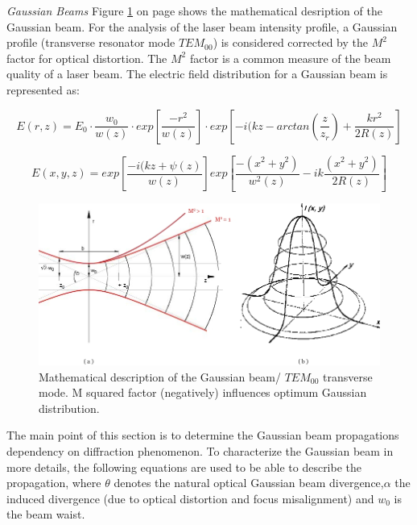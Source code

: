 \textit{Gaussian Beams}
Figure \ref{gaussian_beam} on page \pageref{gaussian_beam} shows the mathematical desription of the Gaussian beam. For the analysis of the \acs{laser} beam intensity profile, a Gaussian profile (transverse resonator mode $TEM_{00}$) is considered corrected by the $M^{2}$ factor for optical distortion. The $M^{2}$ factor is a common measure of the beam quality of a laser beam.  The electric field distribution for a Gaussian beam is represented as:

\begin{equation}
	E(r,z) = E_{0}\cdot \frac{w_{0}}{w(z)} \cdot exp\left[\frac{-r^{2}}{w(z)}\right]\cdot exp\left[-i(kz-arctan\left(\frac{z}{z_{r}}\right)+\frac{kr^{2}}{2R(z)}\right]
\end{equation}

\begin{equation}
	E(x,y,z) = exp\left[\frac{-i(kz + \psi(z)}{w(z)}\right]exp\left[\frac{-(x^{2}+y^{2})}{w^{2}(z)} - ik \frac{(x^{2}+y^{2})}{2R(z)}\right]
\end{equation}

\begin{figure} [ht]
\centering
\includegraphics[scale=0.5]{chapters/img/TEM00.jpg}	
\caption{Mathematical description of the Gaussian beam/ $TEM_{00}$ transverse mode. M squared factor (negatively) influences optimum Gaussian distribution.}
\label{gaussian_beam}
\end{figure}

The main point of this section is to determine the Gaussian beam propagations dependency on diffraction phenomenon. To characterize the Gaussian beam in more details, the following equations are used to be able to describe the propagation, where $\theta$ denotes the natural optical Gaussian beam divergence,$\alpha$ the induced divergence (due to optical distortion and focus misalignment) and $w_{0}$ is the beam waist. 

